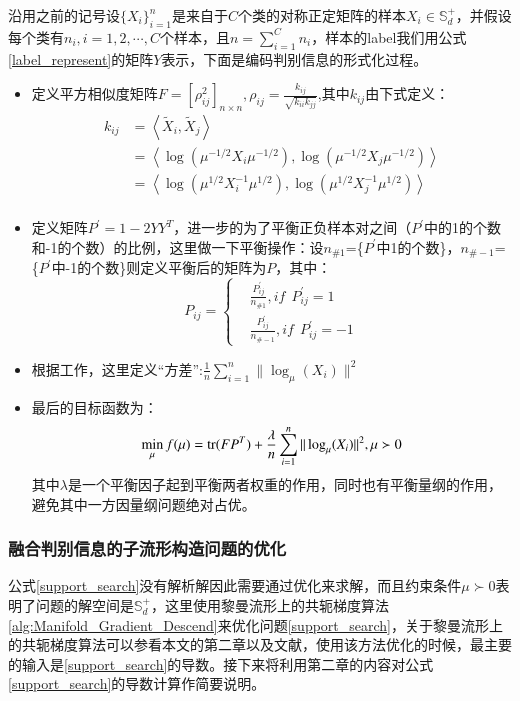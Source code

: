 沿用之前的记号设$\{X_i\}_{i=1}^{n}$是来自于$C$个类的对称正定矩阵的样本$X_i \in \mathbb{S}_{d}^{+}$，并假设每个类有$n_i,i=1,2,\cdots,C$个样本，且$n=\sum_{i=1}^{C}n_i$，样本的label我们用公式\ref{label_represent}的矩阵$Y$表示，下面是编码判别信息的形式化过程。
\begin{itemize}
\item 定义平方相似度矩阵$F=[\rho_{ij}^{2}]_{n\times n},\rho_{ij}=\frac{k_{ij}}{\sqrt{k_{ii}k_{jj}}}$,其中$k_{ij}$由下式定义：
\begin{equation}
\begin{split}
k_{ij}&=\left<\tilde{X}_i,\tilde{X}_j\right>\\
&=\left<\log(\mu^{-1/2}X_i\mu^{-1/2}),\log(\mu^{-1/2}X_j\mu^{-1/2})\right>\\
&=\left<\log(\mu^{1/2}X_{i}^{-1}\mu^{1/2}),\log(\mu^{1/2}X_{j}^{-1}\mu^{1/2})\right>\\
\end{split}
\end{equation}
\item 定义矩阵$P^{\prime}=1-2YY^{T}$，进一步的为了平衡正负样本对之间（$P^{\prime}$中的1的个数和-1的个数）的比例，这里做一下平衡操作：设$n_{\#1}$=\{$P^{\prime}$中1的个数\}，$n_{\#-1}$=\{$P^{\prime}$中-1的个数\}则定义平衡后的矩阵为$P$，其中：
\begin{equation}
P_{ij}=\left\{
\begin{split}
&\frac{P_{ij}^{\prime}}{n_{\#1}},if~~P_{ij}^{\prime}=1\\
&\frac{P_{ij}^{\prime}}{n_{\#-1}},if~~P_{ij}^{\prime}=-1
\end{split}
\right.
\end{equation}
\item 根据工作\cite{PGA}，这里定义“方差”:$\frac{1}{n}\sum_{i=1}^{n} \|\log_{\mu}(X_i)\|^2$
\item 最后的目标函数为：
\begin{equation}
\label{support_search}
\min_{\mu}f(\mu)={\rm tr}(FP^{T})+\frac{\lambda}{n}\sum_{i=1}^{n} \|\log_{\mu}(X_i)\|^2,\mu \succ 0
\end{equation}
其中$\lambda$是一个平衡因子起到平衡两者权重的作用，同时也有平衡量纲的作用，避免其中一方因量纲问题绝对占优。
\end{itemize}
\subsubsection{融合判别信息的子流形构造问题的优化}
\label{sec:discrim_single_support_opt}
公式\ref{support_search}没有解析解因此需要通过优化来求解，而且约束条件$\mu \succ 0$表明了问题的解空间是$\mathbb{S}_{d}^{+}$，这里使用黎曼流形上的共轭梯度算法\ref{alg:Manifold_Gradient_Descend}来优化问题\ref{support_search}，关于黎曼流形上的共轭梯度算法可以参看本文的第二章以及文献\cite{Conjugate_Gradient_Survery}，使用该方法优化的时候，最主要的输入是\ref{support_search}的导数。接下来将利用第二章的内容对公式\ref{support_search}的导数计算作简要说明。

